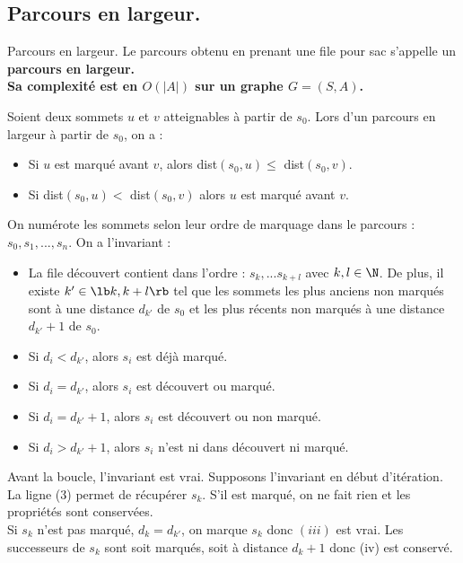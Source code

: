 \documentclass[french, 11pt]{article}
\begin{document}
\vspace*{-0.7cm}

\subsection{Parcours en largeur.}

\begin{defi}{Parcours en largeur.}{}
    Le parcours obtenu en prenant une file pour sac s'appelle un \bf{parcours en largeur}.\\
    Sa complexité est en $O(|A|)$ sur un graphe $G=(S,A)$.
\end{defi}

\vspace*{-0.7cm}

\begin{prop}{}{}
    Soient deux sommets $u$ et $v$ atteignables à partir de $s_0$. Lors d'un parcours en largeur à partir de $s_0$, on a :
    \begin{itemize}
        \item Si $u$ est marqué avant $v$, alors dist$(s_0,u)\leq$ dist$(s_0,v)$.
        \item Si dist$(s_0,u)<$ dist$(s_0,v)$ alors $u$ est marqué avant $v$.
    \end{itemize}
    \tcblower
    On numérote les sommets selon leur ordre de marquage dans le parcours : $s_0,s_1,...,s_n$. On a l'invariant :
    \begin{itemize}[topsep=0pt,itemsep=-0.2 ex]
        \item[(i)] La file découvert contient dans l'ordre : $s_k,...s_{k+l}$ avec $k,l\in\N$. De plus, il existe $k'\in\lb k,k+l\rb$ tel que les sommets les plus anciens non marqués sont à une distance $d_{k'}$ de $s_0$ et les plus récents non marqués à une distance $d_{k'}+1$ de $s_0$.
        \item[(ii)] Si $d_i<d_{k'}$, alors $s_i$ est déjà marqué.
        \item[(iii)] Si $d_i=d_{k'}$, alors $s_i$ est découvert ou marqué.
        \item[(iv)] Si $d_i=d_{k'}+1$, alors $s_i$ est découvert ou non marqué.
        \item[(v)] Si $d_i>d_{k'}+1$, alors $s_i$ n'est ni dans découvert ni marqué. 
    \end{itemize}
    Avant la boucle, l'invariant est vrai. Supposons l'invariant en début d'itération.\\
    La ligne (3) permet de récupérer $s_k$. S'il est marqué, on ne fait rien et les propriétés sont conservées.\\
    Si $s_k$ n'est pas marqué, $d_k=d_{k'}$, on marque $s_k$ donc $(iii)$ est vrai. Les successeurs de $s_k$ sont soit marqués, soit à distance $d_k+1$ donc (iv) est conservé.
\end{prop}
\end{document}
